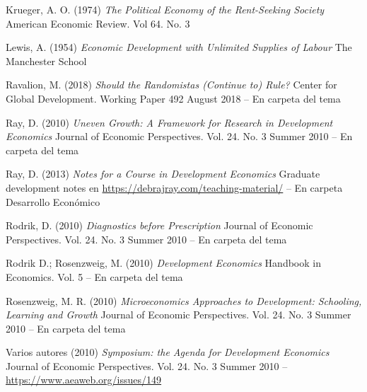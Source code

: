 \documentclass{nuevotema}
\begin{document}
Krueger, A. O. (1974) \textit{The Political Economy of the Rent-Seeking Society} American Economic Review. Vol 64. No. 3

Lewis, A. (1954) \textit{Economic Development with Unlimited Supplies of Labour} The Manchester School

Ravalion, M. (2018) \textit{Should the Randomistas (Continue to) Rule?} Center for Global Development. Working Paper 492 August 2018 -- En carpeta del tema

Ray, D. (2010) \textit{Uneven Growth: A Framework for Research in Development Economics} Journal of Economic Perspectives. Vol. 24. No. 3 Summer 2010 -- En carpeta del tema

Ray, D. (2013) \textit{Notes for a Course in Development Economics} Graduate development notes en \url{https://debrajray.com/teaching-material/} -- En carpeta Desarrollo Económico

Rodrik, D. (2010) \textit{Diagnostics before Prescription} Journal of Economic Perspectives. Vol. 24. No. 3 Summer 2010 -- En carpeta del tema

Rodrik D.; Rosenzweig, M. (2010) \textit{Development Economics} Handbook in Economics. Vol. 5 -- En carpeta del tema

Rosenzweig, M. R. (2010) \textit{Microeconomics Approaches to Development: Schooling, Learning and Growth} Journal of Economic Perspectives. Vol. 24. No. 3 Summer 2010 -- En carpeta del tema

Varios autores (2010) \textit{Symposium: the Agenda for Development Economics} Journal of Economic Perspectives. Vol. 24. No. 3 Summer 2010 -- \url{https://www.aeaweb.org/issues/149}
\end{document}

